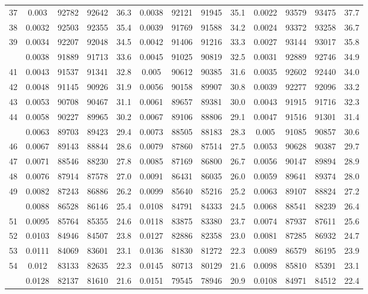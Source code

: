 \documentclass[
  14pt,
]{article}
\begin{document}
\begin{longtable}[t]{lcccccccccccc}
37 & 0.003 & 92782 & 92642 & 36.3 & 0.0038 & 92121 & 91945 & 35.1 & 0.0022 & 93579 & 93475 & 37.7\\
38 & 0.0032 & 92503 & 92355 & 35.4 & 0.0039 & 91769 & 91588 & 34.2 & 0.0024 & 93372 & 93258 & 36.7\\
39 & 0.0034 & 92207 & 92048 & 34.5 & 0.0042 & 91406 & 91216 & 33.3 & 0.0027 & 93144 & 93017 & 35.8\\
\addlinespace
40 & 0.0038 & 91889 & 91713 & 33.6 & 0.0045 & 91025 & 90819 & 32.5 & 0.0031 & 92889 & 92746 & 34.9\\
41 & 0.0043 & 91537 & 91341 & 32.8 & 0.005 & 90612 & 90385 & 31.6 & 0.0035 & 92602 & 92440 & 34.0\\
42 & 0.0048 & 91145 & 90926 & 31.9 & 0.0056 & 90158 & 89907 & 30.8 & 0.0039 & 92277 & 92096 & 33.2\\
43 & 0.0053 & 90708 & 90467 & 31.1 & 0.0061 & 89657 & 89381 & 30.0 & 0.0043 & 91915 & 91716 & 32.3\\
44 & 0.0058 & 90227 & 89965 & 30.2 & 0.0067 & 89106 & 88806 & 29.1 & 0.0047 & 91516 & 91301 & 31.4\\
\addlinespace
45 & 0.0063 & 89703 & 89423 & 29.4 & 0.0073 & 88505 & 88183 & 28.3 & 0.005 & 91085 & 90857 & 30.6\\
46 & 0.0067 & 89143 & 88844 & 28.6 & 0.0079 & 87860 & 87514 & 27.5 & 0.0053 & 90628 & 90387 & 29.7\\
47 & 0.0071 & 88546 & 88230 & 27.8 & 0.0085 & 87169 & 86800 & 26.7 & 0.0056 & 90147 & 89894 & 28.9\\
48 & 0.0076 & 87914 & 87578 & 27.0 & 0.0091 & 86431 & 86035 & 26.0 & 0.0059 & 89641 & 89374 & 28.0\\
49 & 0.0082 & 87243 & 86886 & 26.2 & 0.0099 & 85640 & 85216 & 25.2 & 0.0063 & 89107 & 88824 & 27.2\\
\addlinespace
50 & 0.0088 & 86528 & 86146 & 25.4 & 0.0108 & 84791 & 84333 & 24.5 & 0.0068 & 88541 & 88239 & 26.4\\
51 & 0.0095 & 85764 & 85355 & 24.6 & 0.0118 & 83875 & 83380 & 23.7 & 0.0074 & 87937 & 87611 & 25.6\\
52 & 0.0103 & 84946 & 84507 & 23.8 & 0.0127 & 82886 & 82358 & 23.0 & 0.0081 & 87285 & 86932 & 24.7\\
53 & 0.0111 & 84069 & 83601 & 23.1 & 0.0136 & 81830 & 81272 & 22.3 & 0.0089 & 86579 & 86195 & 23.9\\
54 & 0.012 & 83133 & 82635 & 22.3 & 0.0145 & 80713 & 80129 & 21.6 & 0.0098 & 85810 & 85391 & 23.1\\
\addlinespace
55 & 0.0128 & 82137 & 81610 & 21.6 & 0.0151 & 79545 & 78946 & 20.9 & 0.0108 & 84971 & 84512 & 22.4\\

\end{longtable}
\end{document}

